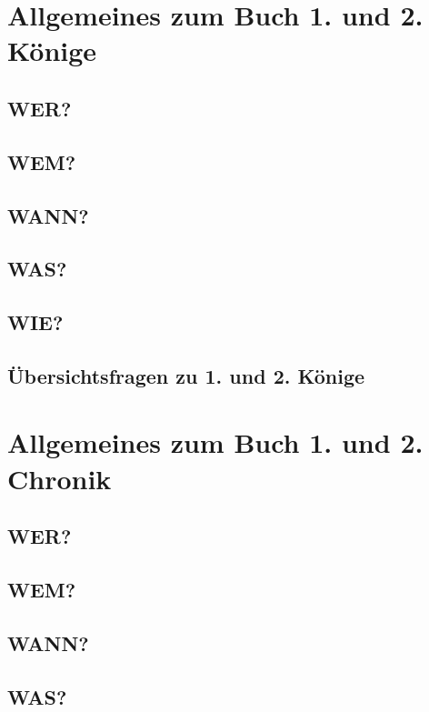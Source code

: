 \section{Allgemeines zum Buch 1. und 2. Könige}
\subsection{WER?}
\subsection{WEM?}
\subsection{WANN?}
\subsection{WAS?}
\subsection{WIE?}
\subsection{Übersichtsfragen zu 1. und 2. Könige}
    
\section{Allgemeines zum Buch 1. und 2. Chronik}
\subsection{WER?}
\subsection{WEM?}
\subsection{WANN?}
\subsection{WAS?}
